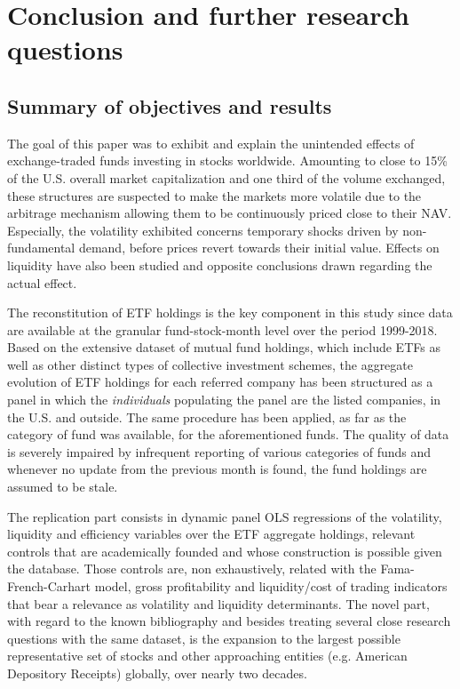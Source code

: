 \section{Conclusion and further research questions}
\label{sec:Conclusion}
\subsection{Summary of objectives and results}
The goal of this paper was to exhibit and explain the unintended effects of exchange-traded funds investing in stocks worldwide. Amounting to close to 15\% of the U.S. overall market capitalization and one third of the volume exchanged, these structures are suspected to make the markets more volatile due to the arbitrage mechanism allowing them to be continuously priced close to their NAV. Especially, the volatility exhibited concerns temporary shocks driven by non-fundamental demand, before prices revert towards their initial value. Effects on liquidity have also been studied and opposite conclusions drawn regarding the actual effect.

The reconstitution of ETF holdings is the key component in this study since data are available at the granular fund-stock-month level over the period 1999-2018. Based on the extensive dataset of mutual fund holdings, which include ETFs as well as other distinct types of collective investment schemes, the aggregate evolution of ETF holdings for each referred company has been structured as a panel in which the \textit{individuals} populating the panel are the listed companies, in the U.S. and outside. The same procedure has been applied, as far as the category of fund was available, for the aforementioned funds. The quality of data is severely impaired by infrequent reporting of various categories of funds and whenever no update from the previous month is found, the fund holdings are assumed to be stale.

The replication part consists in dynamic panel OLS regressions of the volatility, liquidity and efficiency variables over the ETF aggregate holdings, relevant controls that are academically founded and whose construction is possible given the database. Those controls are, non exhaustively, related with the Fama-French-Carhart model, gross profitability and liquidity/cost of trading indicators that bear a relevance as volatility and liquidity determinants. The novel part, with regard to the known bibliography and besides treating several close research questions with the same dataset, is the expansion to the largest possible representative set of stocks and other approaching entities (e.g. American Depository Receipts) globally, over nearly two decades.

